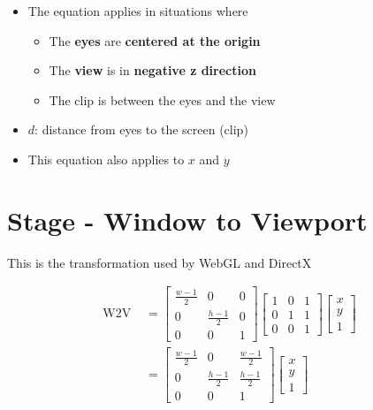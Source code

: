     \begin{itemize}
      \item The equation applies in situations where
      \begin{itemize}
        \item The \textbf{eyes} are \textbf{centered at the origin}
        \item The \textbf{view} is in \textbf{negative z direction}
        \item The clip is between the eyes and the view
      \end{itemize}

      \item $ d $: distance from eyes to the screen (clip)
      \item This equation also applies to $ x $ and $ y $
    \end{itemize}

\section{Stage - Window to Viewport}

  This is the transformation used by WebGL and DirectX

  \begin{align}
    \text{W2V } &=
    \begin{bmatrix}
      \frac{w - 1}{2} & 0 & 0 \\
      0 & \frac{h - 1}{2} & 0 \\
      0 & 0 & 1
    \end{bmatrix}
    \begin{bmatrix}
      1 & 0 & 1 \\
      0 & 1 & 1 \\
      0 & 0 & 1
    \end{bmatrix}
    \begin{bmatrix}
      x \\
      y \\
      1
    \end{bmatrix} \\
    &=
    \begin{bmatrix}
      \frac{w - 1}{2} & 0 & \frac{w - 1}{2} \\
      0 & \frac{h - 1}{2} & \frac{h - 1}{2} \\
      0 & 0 & 1
    \end{bmatrix}
    \begin{bmatrix}
      x \\
      y \\
      1
    \end{bmatrix}
  \end{align}


